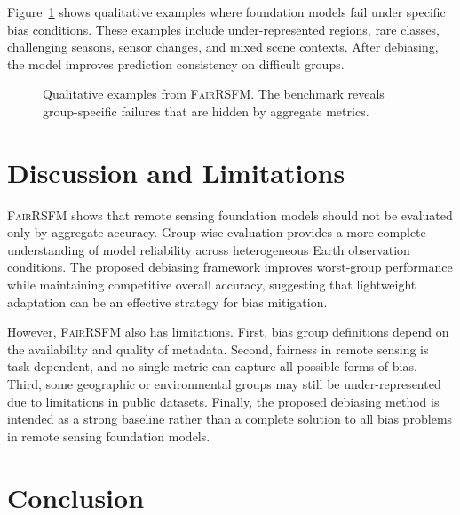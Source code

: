 \documentclass[10pt,twocolumn,letterpaper]{article}
\newcommand{\method}{\textsc{FairRSFM}\xspace}
\begin{document}
Figure~\ref{fig:qualitative} shows qualitative examples where foundation models fail under specific bias conditions. These examples include under-represented regions, rare classes, challenging seasons, sensor changes, and mixed scene contexts. After debiasing, the model improves prediction consistency on difficult groups.

\begin{figure}[t]
\centering
{}
\caption{Qualitative examples from \method. The benchmark reveals group-specific failures that are hidden by aggregate metrics.}
\label{fig:qualitative}
\end{figure}

\section{Discussion and Limitations}

\method shows that remote sensing foundation models should not be evaluated only by aggregate accuracy. Group-wise evaluation provides a more complete understanding of model reliability across heterogeneous Earth observation conditions. The proposed debiasing framework improves worst-group performance while maintaining competitive overall accuracy, suggesting that lightweight adaptation can be an effective strategy for bias mitigation.

However, \method also has limitations. First, bias group definitions depend on the availability and quality of metadata. Second, fairness in remote sensing is task-dependent, and no single metric can capture all possible forms of bias. Third, some geographic or environmental groups may still be under-represented due to limitations in public datasets. Finally, the proposed debiasing method is intended as a strong baseline rather than a complete solution to all bias problems in remote sensing foundation models.

\section{Conclusion}
\end{document}
